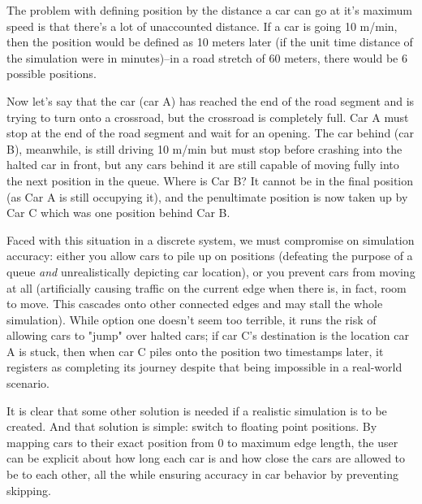 \par The problem with defining position by the distance a car can go at it's maximum speed is that there's a lot of unaccounted distance.  If a car is going 10 m/min, then the position would be defined as 10 meters later (if the unit time distance of the simulation were in minutes)--in a road stretch of 60 meters, there would be 6 possible positions.  \\


\par Now let's say that the car (car A) has reached the end of the road segment and is trying to turn onto a crossroad, but the crossroad is completely full.  Car A must stop at the end of the road segment and wait for an opening.  The car behind (car B), meanwhile, is still driving 10 m/min but must stop before crashing into the halted car in front, but any cars behind it are still capable of moving fully into the next position in the queue.  Where is Car B?  It cannot be in the final position (as Car A is still occupying it), and the penultimate position is now taken up by Car C which was one position behind Car B.\\


\par Faced with this situation in a discrete system, we must compromise on simulation accuracy:  either you allow cars to pile up on positions (defeating the purpose of a queue \textit{and} unrealistically depicting car location), or you prevent cars from moving at all (artificially causing traffic on the current edge when there is, in fact, room to move.  This cascades onto other connected edges and may stall the whole simulation).  While option one doesn't seem too terrible, it runs the risk of allowing cars to "jump" over halted cars; if car C's destination is the location car A is stuck, then when car C piles onto the position two timestamps later, it registers as completing its journey despite that being impossible in a real-world scenario.  \\

\par It is clear that some other solution is needed if a realistic simulation is to be created.  And that solution is simple:  switch to floating point positions.  By mapping cars to their exact position from 0 to maximum edge length, the user can be explicit about how long each car is and how close the cars are allowed to be to each other, all the while ensuring accuracy in car behavior by preventing skipping.


